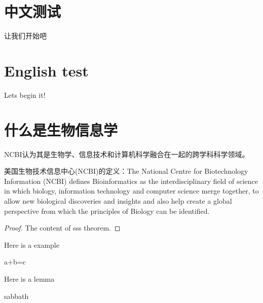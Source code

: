\documentclass[]{subook}
\begin{document}
\section{中文测试}
让我们开始吧~ 
\zhlipsum[1-3]

\section{English test}

Lets begin it!
\lipsum[1-2]


\section{什么是生物信息学
}

NCBI认为其是生物学、信息技术和计算机科学融合在一起的跨学科科学领域。

美国生物技术信息中心(NCBI)的定义：The National Centre for Biotechnology Information (NCBI) defines Bioinformatics as the interdisciplinary field of science in which biology, information technology and computer science merge together, to allow new biological discoveries and insights and also help create a global perspective from which the principles of Biology can be identified. 
\begin{proof}
    The content of sss theorem.
\end{proof}



Here is a example
\begin{example}
    a+b=c
\end{example}



Here is a lemma
\begin{lemma}
    sabbath
\end{lemma}
\end{document}
